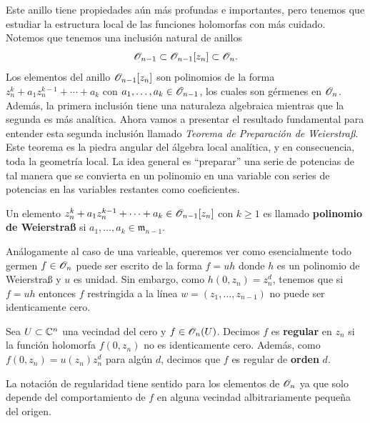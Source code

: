 Este anillo tiene propiedades aún más profundas e importantes, pero tenemos que estudiar la estructura local de las funciones holomorfas con más cuidado. Notemos que tenemos una inclusión natural de anillos 
\begin{equation*}
	\mathscr{O}_{n-1}\subset \mathscr{O}_{n-1}[z_n]\subset \mathscr{O}_n.
\end{equation*}
Los elementos del anillo $\mathscr{O}_{n-1}[z_n]$ son polinomios de la forma $z_n^k+a_1z_n^{k-1}+\cdots+a_k$ con $a_1,\dots,a_k\in \mathscr{O}_{n-1}$, los cuales son gérmenes en $\mathscr{O}_n$. Además, la primera inclusión tiene una naturaleza algebraica mientras que la segunda es más analítica. Ahora vamos a presentar el resultado fundamental para entender esta segunda inclusión llamado \textit{Teorema de Preparación de Weierstraß}. Este teorema es la piedra angular del álgebra local analítica, y en consecuencia, toda la geometría local. La idea general es \enquote{preparar} una serie de potencias de tal manera que se convierta en un polinomio en una variable con series de potencias en las variables restantes como coeficientes.

\begin{definition}
	Un elemento $z_n^k+a_1z_n^{k-1}+\cdots+a_k\in\mathscr{O}_{n-1}[z_n]$ con $k\geq 1$ es llamado \textbf{polinomio de Weierstraß} si $a_1,\dots,a_k\in \mathfrak{m}_{n-1}$.
\end{definition}
Análogamente al caso de una varieable, queremos ver como esencialmente todo germen $f\in\mathscr{O}_n$ puede ser escrito de la forma $f=uh$ donde $h$ es un polinomio de Weierstraß y $u$ es unidad. Sin embargo, como $h(0,z_n)=z_n^d$, tenemos que si $f=uh$ entonces $f$ restringida a la línea $w=(z_1,\dots,z_{n-1})$ no puede ser identicamente cero.  
\begin{definition}
	Sea $U\subset\mathbb{C}^n$ una vecindad del cero y $f\in\mathscr{O}_n(U)$. Decimos $f$ es \textbf{regular} en $z_n$ si la función holomorfa $f(0,z_n)$ no es identicamente cero. Además, como $f(0,z_n)=u(z_n)z_n^d$ para algún $d$, decimos que $f$ es regular de \textbf{orden} $d$.
\end{definition}
La notación de regularidad tiene sentido para los elementos de $\mathscr{O}_n$ ya que solo depende del comportamiento de $f$ en alguna vecindad albitrariamente pequeña del origen.

